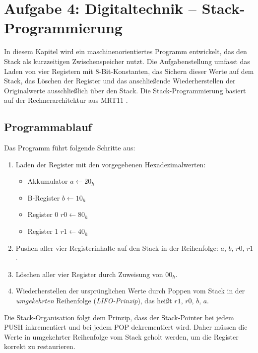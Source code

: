 

\section{Aufgabe 4: Digitaltechnik – Stack-Programmierung}
In diesem Kapitel wird ein maschinenorientiertes Programm entwickelt, das den Stack als kurzzeitigen Zwischenspeicher nutzt.  
Die Aufgabenstellung umfasst das Laden von vier Registern mit 8‑Bit‑Konstanten, das Sichern dieser Werte auf dem Stack, das Löschen der Register und das anschließende Wiederherstellen der Originalwerte ausschließlich über den Stack.
Die Stack-Programmierung basiert auf der Rechnerarchitektur aus MRT11 \cite{1}.
\subsection{Programmablauf}
Das Programm führt folgende Schritte aus:
\begin{enumerate}
    \item Laden der Register mit den vorgegebenen Hexadezimalwerten:
    \begin{itemize}
        \item Akkumulator \(a \leftarrow 20_h\)
        \item B‑Register \(b \leftarrow 10_h\)
        \item Register 0 \(r0 \leftarrow 80_h\)
        \item Register 1 \(r1 \leftarrow 40_h\)
    \end{itemize}
    \item Pushen aller vier Registerinhalte auf den Stack in der Reihenfolge: \(a\), \(b\), \(r0\), \(r1\).
    \item Löschen aller vier Register durch Zuweisung von \(00_h\).
    \item Wiederherstellen der ursprünglichen Werte durch Poppen vom Stack in der \emph{umgekehrten} Reihenfolge (\textit{LIFO-Prinzip}), das heißt \(r1\), \(r0\), \(b\), \(a\).
\end{enumerate}
Die Stack‑Organisation folgt dem Prinzip, dass der Stack‑Pointer bei jedem PUSH inkrementiert und bei jedem POP dekrementiert wird. Daher müssen die Werte in umgekehrter Reihenfolge vom Stack geholt werden, um die Register korrekt zu restaurieren.
